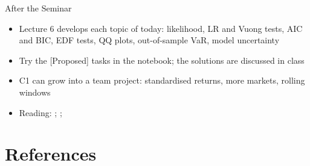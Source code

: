 \begin{frame}{After the Seminar}
\itemsize{\small}
\begin{itemize}
    \item Lecture 6 develops each topic of today: likelihood, LR and Vuong tests, AIC and BIC, EDF tests, QQ plots, out-of-sample VaR, model uncertainty
    \item Try the [Proposed] tasks in the notebook; the solutions are discussed in class
    \item C1 can grow into a team project: standardised returns, more markets, rolling windows
    \item Reading: ; ; 
\end{itemize}
\end{frame}


\section{References}

